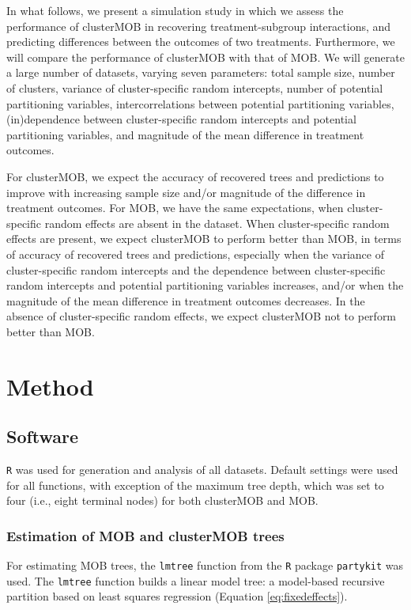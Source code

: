 \documentclass[nobf,man]{apa}
\begin{document}
In what follows, we present a simulation study in which we assess the performance of clusterMOB in recovering treatment-subgroup interactions, and predicting differences between the outcomes of two treatments. Furthermore, we will compare the performance of clusterMOB with that of MOB. We will generate a large number of datasets, varying seven parameters: total sample size, number of clusters, variance of cluster-specific random intercepts, number of potential partitioning variables, intercorrelations between potential partitioning variables, (in)dependence between cluster-specific random intercepts and potential partitioning variables, and magnitude of the mean difference in treatment outcomes.

For clusterMOB, we expect the accuracy of recovered trees and predictions to improve with increasing sample size and/or magnitude of the difference in treatment outcomes. For MOB, we have the same expectations, when cluster-specific random effects are absent in the dataset. When cluster-specific random effects are present, we expect clusterMOB to perform better than MOB, in terms of accuracy of recovered trees and predictions, especially when the variance of cluster-specific random intercepts and the dependence between cluster-specific random intercepts and potential partitioning variables increases, and/or when the magnitude of the mean difference in treatment outcomes decreases. In the absence of cluster-specific random effects, we expect clusterMOB not to perform better than MOB.


\section{Method}

\subsection{Software}

\verb|R| \cite{R10} was used for generation and analysis of all datasets. Default settings were used for all functions, with exception of the maximum tree depth, which was set to four (i.e., eight terminal nodes) for both clusterMOB and MOB.

\subsubsection{Estimation of MOB and clusterMOB trees}

For estimating MOB trees, the \verb|lmtree| function from the \verb|R| package \verb|partykit| \cite{HothyZeil14,ZeilyHoth08} was used. The \verb|lmtree| function builds a linear model tree: a model-based recursive partition based on least squares regression (Equation \ref{eq:fixedeffects}).  
\end{document}
